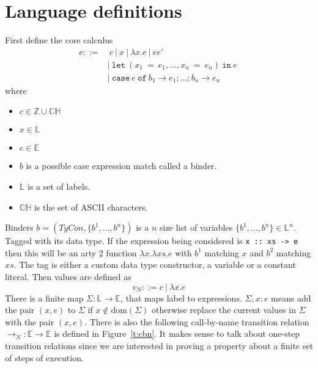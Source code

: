 \documentclass[float=false, crop=false]{standalone}
\numberwithin{subcase}{case}
\newcommand{\tcbn}{\rightarrow_N}
\begin{document}
\section{Language definitions}

First define the core calculus 
\begin{align*}
  e ::=&\ c\ |\ x\ |\ \lambda x.e\ |\ e e'\
  \\ &|\ \mathtt{let}\ (x_1\ \mathtt{=}\ e_1,\dotsc, x_n\ \mathtt{=}\ e_n)\ \mathtt{in}\ e\
  \\ &|\ \mathtt{case}\ e\ \mathtt{of}\ b_1 \rightarrow e_1; \dots; b_n \rightarrow e_n
\end{align*} 
where 
\begin{itemize}
  \item $c\in\mathbb{Z}\cup\mathbb{CH}$ 
  \item $x\in \mathbb{L}$
  \item $e\in\mathbb{E}$ 
  \item $b$ is a possible case expression match called a binder.
  \item $\mathbb{L}$ is a set of labels.
  \item $\mathbb{CH}$ is the set of ASCII characters.
\end{itemize} 

Binders $b = (\mathit{TyCon},\{b^1,\dotsc,b^n\})$ is a $n$ size list of variables 
\mbox{$\{b^1,\dotsc,b^n \}\in \mathbb{L}^n$}. Tagged with its data type. If the expression
being considered is \mbox{\texttt{x :: xs -> e}} then this will be an arty 2 function
$\lambda x.\lambda \mathit{xs}. e$ with $b^1$ matching $x$ and $b^2$ matching $xs$.
The tag is either a custom data type constructor, a variable or a constant literal. 
Then values are defined as \[v_N ::= c\ |\ \lambda x.e \]
There is a finite map $\Sigma : \mathbb{L} 
\rightarrow \mathbb{E}$, that maps label to expressions. 
$\Sigma,x:e$ means add the pair $(x,e)$ to $\Sigma$ if $x \not\in\text{dom}(\Sigma)$
otherwise replace the current values in $\Sigma$ with the pair $(x,e)$.
There is also the following call-by-name transition relation 
\mbox{$\tcbn : \mathbb{E} \rightarrow \mathbb{E}$} is defined in Figure~\ref{t:cbn}. It makes sense to talk about one-step transition relations since
we are interested in proving a property about
a finite set of steps of execution.
\end{document}
